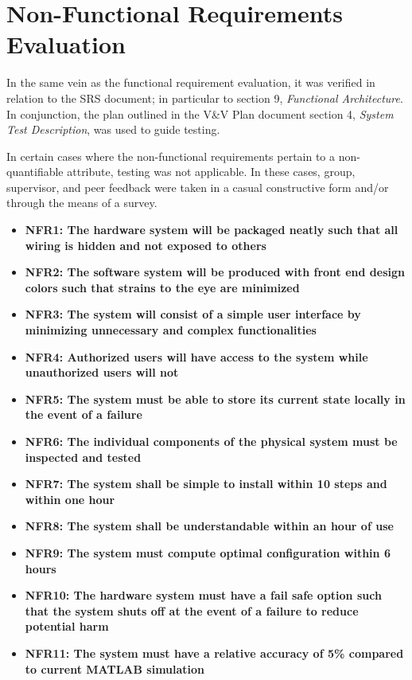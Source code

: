 \documentclass[12pt, titlepage]{article}
\begin{document}
\section{Non-Functional Requirements Evaluation}
In the same vein as the functional requirement evaluation, it was verified in relation to the SRS document; in particular to section 9, \emph{Functional Architecture}. In conjunction, the plan outlined in the V\&V Plan document section 4, \emph{System Test Description}, was used to guide testing.
\par
In certain cases where the non-functional requirements pertain to a non-quantifiable attribute, testing was not applicable. In these cases, group, supervisor, and peer feedback were taken in a casual constructive form and/or through the means of a survey.

\begin{center}
    \begin{itemize}
        \item \textbf{NFR1: The hardware system will be packaged neatly such that all wiring is hidden and not exposed to others}
        \item \textbf{NFR2: The software system will be produced with front end design colors such that strains to the eye are minimized}
        \item \textbf{NFR3: The system will consist of a simple user interface by minimizing unnecessary and complex functionalities}
        \item \textbf{NFR4: Authorized users will have access to the system while unauthorized users will not}
        \item \textbf{NFR5: The system must be able to store its current state locally in the event of a failure}
        \item \textbf{NFR6: The individual components of the physical system must be inspected and tested}
        \item \textbf{NFR7: The system shall be simple to install within 10 steps and within one hour}
        \item \textbf{NFR8: The system shall be understandable within an hour of use}
        \item \textbf{NFR9: The system must compute optimal configuration within 6 hours}
        \item \textbf{NFR10: The hardware system must have a fail safe option such that the system shuts off at the event of a failure to reduce potential harm}
        \item \textbf{NFR11: The system must have a relative accuracy of 5\% compared to current MATLAB simulation}

\end{itemize}
\end{center}
\end{document}
